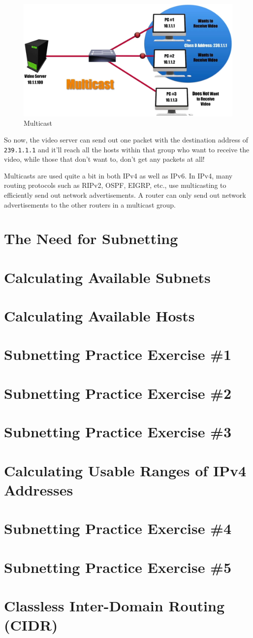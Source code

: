 \begin{figure}[H]
	\centering
	\includegraphics[width=0.7\linewidth]{"Mod1/chapters/1.6.c Multicast"}
	\caption{Multicast}
	\label{fig:multicast}
\end{figure}
\vspace{-15pt}

\noindent
So now, the video server can send out one packet with the destination address of \verb|239.1.1.1| and it'll reach all the hosts within that group who want to receive the video, while those that don't want to, don't get any packets at all!

Multicasts are used quite a bit in both IPv4 as well as IPv6. In IPv4, many routing protocols such as RIPv2, OSPF, EIGRP, etc., use multicasting to efficiently send out network advertisements. A router can only send out network advertisements to the other routers in a multicast group. 

\section{The Need for Subnetting}


\section{Calculating Available Subnets}
\section{Calculating Available Hosts}
\section{Subnetting Practice Exercise \#1}
\section{Subnetting Practice Exercise \#2}
\section{Subnetting Practice Exercise \#3}
\section{Calculating Usable Ranges of IPv4 Addresses}
\section{Subnetting Practice Exercise \#4}
\section{Subnetting Practice Exercise \#5}
\section{Classless Inter-Domain Routing (CIDR)}
